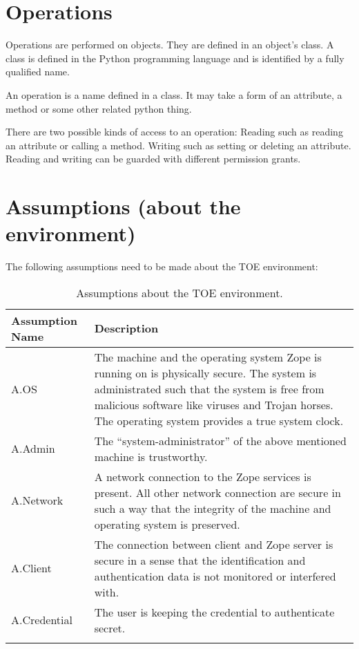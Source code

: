 \documentclass[12pt,english]{scrbook}
\begin{document}



\section{Operations}

Operations are performed on objects. They are defined in an object's class. A
class is defined in the Python programming language and is identified by a
fully qualified name.

An operation is a name defined in a class. It may take a form of an attribute,
a method or some other related python thing.

There are two possible kinds of access to an operation: Reading such as
reading an attribute or calling a method. Writing such as setting or deleting
an attribute. Reading and writing can be guarded with different permission
grants.





\section{Assumptions (about the environment)}

The following assumptions need to be made about the TOE environment:

\begin{longtable}[c]{lp{10cm}}
  \toprule
  Assumption Name & Description \\
  \midrule

  A.OS & The machine and the operating system Zope is running on is physically
  secure. The system is administrated such that the system is free from
  malicious software like viruses and Trojan horses. The operating system
  provides a true system clock. \\

  A.Admin & 
  The ``system-administrator'' of the above
  mentioned machine is trustworthy.
   \\

  A.Network & 
  A network connection to the Zope services is
  present. All other network connection are
  secure in such a way that the integrity of
  the machine and operating system is preserved.
   \\

  A.Client & 
  The connection between client and Zope server is
  secure in a sense that the identification and
  authentication data is not monitored or interfered with.
   \\

  A.Credential & 
  The user is keeping the credential to authenticate
  secret. \\

  \bottomrule
  \caption{Assumptions about the TOE environment.}
  \label{tab-A}
\end{longtable}
\end{document}
